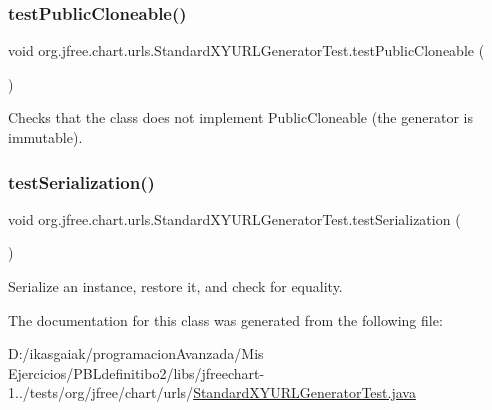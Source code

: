 \subsubsection{\texorpdfstring{test\+Public\+Cloneable()}{testPublicCloneable()}}
{\footnotesize\ttfamily void org.\+jfree.\+chart.\+urls.\+Standard\+X\+Y\+U\+R\+L\+Generator\+Test.\+test\+Public\+Cloneable (\begin{DoxyParamCaption}{ }\end{DoxyParamCaption})}

Checks that the class does not implement Public\+Cloneable (the generator is immutable). \mbox{\label{classorg_1_1jfree_1_1chart_1_1urls_1_1_standard_x_y_u_r_l_generator_test_a4196d7679f8755c2bd97c88cb8d62456}} 
\subsubsection{\texorpdfstring{test\+Serialization()}{testSerialization()}}
{\footnotesize\ttfamily void org.\+jfree.\+chart.\+urls.\+Standard\+X\+Y\+U\+R\+L\+Generator\+Test.\+test\+Serialization (\begin{DoxyParamCaption}{ }\end{DoxyParamCaption})}

Serialize an instance, restore it, and check for equality. 

The documentation for this class was generated from the following file\+:\begin{DoxyCompactItemize}
\item 
D\+:/ikasgaiak/programacion\+Avanzada/\+Mis Ejercicios/\+P\+B\+Ldefinitibo2/libs/jfreechart-\/1../tests/org/jfree/chart/urls/\mbox{\hyperlink{_standard_x_y_u_r_l_generator_test_8java}{Standard\+X\+Y\+U\+R\+L\+Generator\+Test.\+java}}\end{DoxyCompactItemize}
